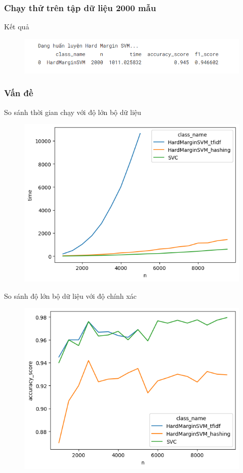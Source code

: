\documentclass[serif, aspectratio=169]{beamer}
\begin{document}
	\subsubsection{Chạy thử trên tập dữ liệu 2000 mẫu}
	\begin{frame}{Kết quả}
		\begin{figure}
			\centering
			\includegraphics[width=1\linewidth]{pic/hardmargin-svm-result2000.png}
			\label{fig:hardmargin-svm-result2000}
		\end{figure}
	\end{frame}
	
	\subsubsection{Vấn đề}
	\begin{frame}{So sánh thời gian chạy với độ lớn bộ dữ liệu}
		\begin{figure}
			\centering
			\includegraphics[width=0.6\linewidth]{pic/n-time-hardmargin-svm.png}
			\label{fig:n-time-hardmargin-svm}
		\end{figure}
	\end{frame}
	
	\begin{frame}{So sánh độ lớn bộ dữ liệu với độ chính xác}
		\begin{figure}
			\centering
			\includegraphics[width=0.6\linewidth]{pic/n-acc-hardmargin-svm.png}
			\label{fig:n-acc-hardmargin-svm}
		\end{figure}
	\end{frame}
	
\end{document}

